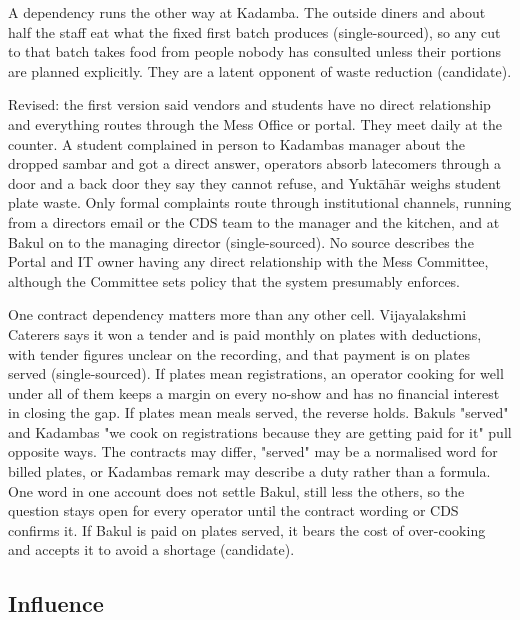 \documentclass[
  10pt,
  table]{article}
\begin{document}
A dependency runs the other way at Kadamba. The outside diners and about half the staff eat what the fixed first batch produces (single-sourced), so any cut to that batch takes food from people nobody has consulted unless their portions are planned explicitly. They are a latent opponent of waste reduction (candidate).

Revised: the first version said vendors and students have no direct relationship and everything routes through the Mess Office or portal. They meet daily at the counter. A student complained in person to Kadamba\textquotesingle s manager about the dropped sambar and got a direct answer, operators absorb latecomers through a door and a back door they say they cannot refuse, and Yuktāhār weighs student plate waste. Only formal complaints route through institutional channels, running from a director\textquotesingle s email or the CDS team to the manager and the kitchen, and at Bakul on to the managing director (single-sourced). No source describes the Portal and IT owner having any direct relationship with the Mess Committee, although the Committee sets policy that the system presumably enforces.

One contract dependency matters more than any other cell. Vijayalakshmi Caterers says it won a tender and is paid monthly on plates with deductions, with tender figures unclear on the recording, and that payment is on plates served (single-sourced). If plates mean registrations, an operator cooking for well under all of them keeps a margin on every no-show and has no financial interest in closing the gap. If plates mean meals served, the reverse holds. Bakul\textquotesingle s "served" and Kadamba\textquotesingle s "we cook on registrations because they are getting paid for it" pull opposite ways. The contracts may differ, "served" may be a normalised word for billed plates, or Kadamba\textquotesingle s remark may describe a duty rather than a formula. One word in one account does not settle Bakul, still less the others, so the question stays open for every operator until the contract wording or CDS confirms it. If Bakul is paid on plates served, it bears the cost of over-cooking and accepts it to avoid a shortage (candidate).

\subsection{Influence}\label{influence}
\end{document}
